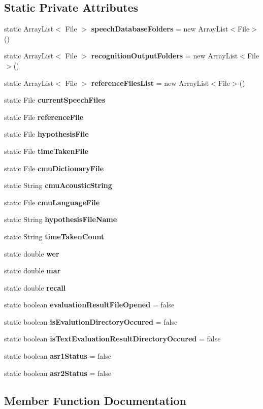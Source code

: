 \subsection*{Static Private Attributes}
\begin{DoxyCompactItemize}
\item 
static Array\+List$<$ File $>$ {\bf speech\+Database\+Folders} = new Array\+List$<$File$>$()
\item 
static Array\+List$<$ File $>$ {\bf recognition\+Output\+Folders} = new Array\+List$<$File$>$()
\item 
static Array\+List$<$ File $>$ {\bf reference\+Files\+List} = new Array\+List$<$File$>$()
\item 
static File {\bf current\+Speech\+Files}
\item 
static File {\bf reference\+File}
\item 
static File {\bf hypothesis\+File}
\item 
static File {\bf time\+Taken\+File}
\item 
static File {\bf cmu\+Dictionary\+File}
\item 
static String {\bf cmu\+Acoustic\+String}
\item 
static File {\bf cmu\+Language\+File}
\item 
static String {\bf hypothesis\+File\+Name}
\item 
static String {\bf time\+Taken\+Count}
\item 
static double {\bf wer}
\item 
static double {\bf mar}
\item 
static double {\bf recall}
\item 
static boolean {\bf evaluation\+Result\+File\+Opened} = false
\item 
static boolean {\bf is\+Evalution\+Directory\+Occured} = false
\item 
static boolean {\bf is\+Text\+Evaluation\+Result\+Directory\+Occured} = false
\item 
static boolean {\bf asr1\+Status} = false
\item 
static boolean {\bf asr2\+Status} = false
\end{DoxyCompactItemize}


\subsection{Member Function Documentation}
